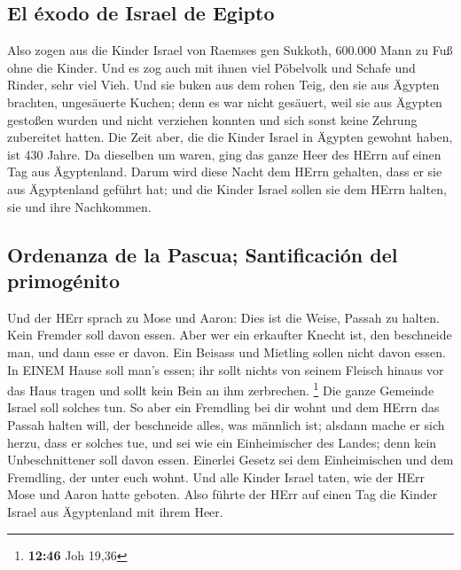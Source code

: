 \hypertarget{el-uxe9xodo-de-israel-de-egipto}{%
\subsection{El éxodo de Israel de
Egipto}\label{el-uxe9xodo-de-israel-de-egipto}}

 Also zogen aus die Kinder Israel von Raemses gen
Sukkoth, 600.000 Mann zu Fuß ohne die Kinder.  Und es zog
auch mit ihnen viel Pöbelvolk und Schafe und Rinder, sehr viel Vieh.
 Und sie buken aus dem rohen Teig, den sie aus Ägypten
brachten, ungesäuerte Kuchen; denn es war nicht gesäuert, weil sie aus
Ägypten gestoßen wurden und nicht verziehen konnten und sich sonst keine
Zehrung zubereitet hatten.  Die Zeit aber, die die Kinder
Israel in Ägypten gewohnt haben, ist 430 Jahre.  Da
dieselben um waren, ging das ganze Heer des HErrn auf einen Tag aus
Ägyptenland.  Darum wird diese Nacht dem HErrn gehalten,
dass er sie aus Ägyptenland geführt hat; und die Kinder Israel sollen
sie dem HErrn halten, sie und ihre Nachkommen.

\hypertarget{ordenanza-de-la-pascua-santificaciuxf3n-del-primoguxe9nito}{%
\subsection{Ordenanza de la Pascua; Santificación del
primogénito}\label{ordenanza-de-la-pascua-santificaciuxf3n-del-primoguxe9nito}}

 Und der HErr sprach zu Mose und Aaron: Dies ist die
Weise, Passah zu halten. Kein Fremder soll davon essen. 
Aber wer ein erkaufter Knecht ist, den beschneide man, und dann esse er
davon.  Ein Beisass und Mietling sollen nicht davon
essen.  In EINEM Hause soll man's essen; ihr sollt nichts
von seinem Fleisch hinaus vor das Haus tragen und sollt kein Bein an ihm
zerbrechen. \footnote{\textbf{12:46} Joh 19,36}  Die
ganze Gemeinde Israel soll solches tun.  So aber ein
Fremdling bei dir wohnt und dem HErrn das Passah halten will, der
beschneide alles, was männlich ist; alsdann mache er sich herzu, dass er
solches tue, und sei wie ein Einheimischer des Landes; denn kein
Unbeschnittener soll davon essen.  Einerlei Gesetz sei
dem Einheimischen und dem Fremdling, der unter euch wohnt.
 Und alle Kinder Israel taten, wie der HErr Mose und
Aaron hatte geboten.  Also führte der HErr auf einen Tag
die Kinder Israel aus Ägyptenland mit ihrem Heer.

